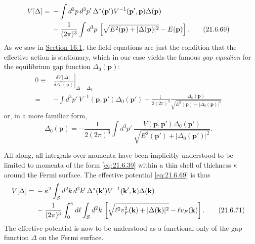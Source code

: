 \begin{align}
V[\Delta]={}&-\int d^3p\,d^3p'\,
\Delta^*(\mathbf p')V^{-1}(\mathbf p',\mathbf p)\Delta(\mathbf p)
\notag\\
&-\frac{1}{(2\pi)^3}\int d^3p\,
\left[
\sqrt{E^2(\mathbf p)+|\Delta(\mathbf p)|^2}-E(\mathbf p)
\right].
\tag{21.6.69}\label{eq:21.6.69}
\end{align}
As we saw in \hyperref[sec:16.1]{Section 16.1}, the field equations are just the condition that the effective action is stationary, which in our case yields the famous \emph{gap equation} for the equilibrium gap function $\Delta_0(\mathbf p)$:
\begin{align*}
0
\equiv{}&
\left.
\frac{\delta V[\Delta]}{\delta\Delta^*(\mathbf p)}
\right|_{\Delta=\Delta_0}
\\
={}&-\int d^3p'\,
V^{-1}(\mathbf p,\mathbf p')\Delta_0(\mathbf p')
-\frac{1}{2(2\pi)^3}
\frac{\Delta_0(\mathbf p)}
{\sqrt{E^2(\mathbf p)+|\Delta_0(\mathbf p)|^2}}
\end{align*}
or, in a more familiar form,
\begin{equation}
\Delta_0(\mathbf p)
=-\frac{1}{2(2\pi)^3}
\int d^3p'\,
\frac{V(\mathbf p,\mathbf p')\Delta_0(\mathbf p')}
{\sqrt{E^2(\mathbf p')+|\Delta_0(\mathbf p')|^2}}.
\tag{21.6.70}\label{eq:21.6.70}
\end{equation}

All along, all integrals over momenta have been implicitly understood to be limited to momenta of the form \eqref{eq:21.6.39} within a thin shell of thickness $\kappa$ around the Fermi surface. The effective potential \eqref{eq:21.6.69} is thus
\begin{align}
V[\Delta]
={}&-\kappa^2\int_{\mathcal S}d^2k\,d^2k'\,
\Delta^*(\mathbf k')V^{-1}(\mathbf k',\mathbf k)\Delta(\mathbf k)
\notag\\
&-\frac{1}{(2\pi)^3}\int_0^\kappa d\ell
\int_{\mathcal S}d^2k\,
\left[
\sqrt{\ell^2v_F^2(\mathbf k)+|\Delta(\mathbf k)|^2}
-\ell v_F(\mathbf k)
\right].
\tag{21.6.71}\label{eq:21.6.71}
\end{align}
The effective potential is now to be understood as a functional only of the gap function $\Delta$ on the Fermi surface.

